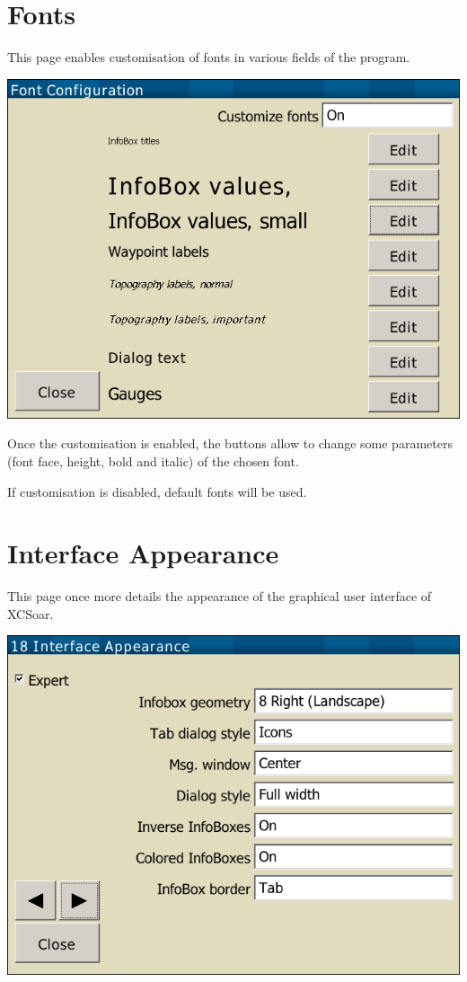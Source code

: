 \clearpage
\section{Fonts}

This page enables customisation of fonts in various fields of the program.

\begin{center}
\includegraphics[angle=0,width=0.8\linewidth,keepaspectratio='true']{figures/config-fonts.png}
\end{center}

Once the customisation is enabled, the  buttons allow to change some parameters (font face, height, bold and italic) of the chosen font.

If customisation is disabled, default fonts will be used.


\clearpage
\section{Interface Appearance}\label{sec:interface-appearance}

This page once more details the appearance of the graphical user interface of XCSoar.

\begin{center}
\includegraphics[angle=0,width=0.8\linewidth,keepaspectratio='true']{figures/config-interface_appearance.png}
\end{center}

